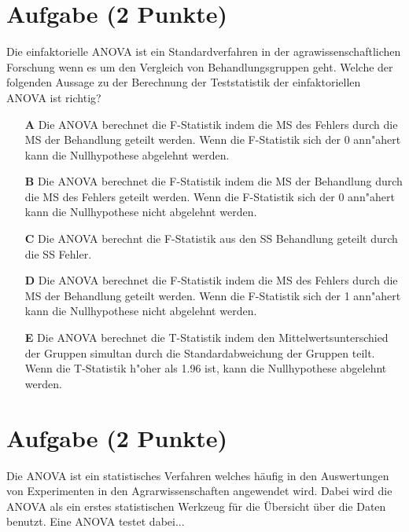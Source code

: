 \documentclass[a4paper, 9pt]{scrartcl}\usepackage[]{graphicx}\usepackage[]{xcolor}
\begin{document}
\section{Aufgabe \hfill (2 Punkte)}



Die einfaktorielle ANOVA ist ein Standardverfahren in der agrawissenschaftlichen Forschung wenn es um den Vergleich von Behandlungsgruppen geht. Welche der folgenden Aussage zu der Berechnung der Teststatistik der einfaktoriellen ANOVA ist richtig?



\begin{enumerate}
\item [\textbf{A} \msquare] Die ANOVA berechnet die F-Statistik indem die MS des Fehlers durch die MS der Behandlung geteilt werden. Wenn die F-Statistik sich der 0 ann{"a}hert kann die Nullhypothese abgelehnt werden.
\item [\textbf{B} \msquare] Die ANOVA berechnet die F-Statistik indem die MS der Behandlung durch die MS des Fehlers geteilt werden. Wenn die F-Statistik sich der 0 ann{"a}hert kann die Nullhypothese nicht abgelehnt werden.
\item [\textbf{C} \msquare] Die ANOVA berechnt die F-Statistik aus den SS Behandlung geteilt durch die SS Fehler.
\item [\textbf{D} \msquare] Die ANOVA berechnet die F-Statistik indem die MS des Fehlers durch die MS der Behandlung geteilt werden. Wenn die F-Statistik sich der 1 ann{"a}hert kann die Nullhypothese nicht abgelehnt werden.
\item [\textbf{E} \msquare] Die ANOVA berechnet die T-Statistik indem den Mittelwertsunterschied der Gruppen simultan durch die Standardabweichung der Gruppen teilt. Wenn die T-Statistik h{"o}her als 1.96 ist, kann die Nullhypothese abgelehnt werden.
\end{enumerate} 

\section{Aufgabe \hfill (2 Punkte)}




Die ANOVA ist ein statistisches Verfahren welches häufig in den Auswertungen von Experimenten in den Agrarwissenschaften angewendet
wird. Dabei wird die ANOVA als ein erstes statistischen Werkzeug für die
Übersicht über die Daten benutzt. Eine ANOVA testet dabei...
\end{document}
